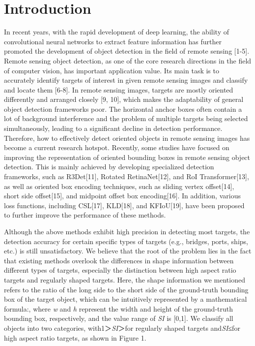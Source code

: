 \documentclass[journal]{IEEEtran}
\begin{document}
\IEEEpeerreviewmaketitle


\section{ Introduction }

In recent years, with the rapid development of deep learning, the ability of convolutional neural networks to extract feature information has further promoted the development of object detection in the field of remote sensing [1-5]. Remote sensing object detection, as one of the core research directions in the field of computer vision, has important application value. Its main task is to accurately identify targets of interest in given remote sensing images and classify and locate them [6-8]. In remote sensing images, targets are mostly oriented differently and arranged closely [9, 10], which makes the adaptability of general object detection frameworks poor. The horizontal anchor boxes often contain a lot of background interference and the problem of multiple targets being selected simultaneously, leading to a significant decline in detection performance. Therefore, how to effectively detect oriented objects in remote sensing images has become a current research hotspot. Recently, some studies have focused on improving the representation of oriented bounding boxes in remote sensing object detection. This is mainly achieved by developing specialized detection frameworks, such as R3Det[11], Rotated RetinaNet[12], and RoI Transformer[13], as well as oriented box encoding techniques, such as sliding vertex offset[14], short side offset[15], and midpoint offset box encoding[16]. In addition, various loss functions, including CSL[17], KLD[18], and KFIoU[19], have been proposed to further improve the performance of these methods.

Although the above methods exhibit high precision in detecting most targets, the detection accuracy for certain specific types of targets (e.g., bridges, ports, ships, etc.) is still unsatisfactory. We believe that the root of the problem lies in the fact that existing methods overlook the differences in shape information between different types of targets, especially the distinction between high aspect ratio targets and regularly shaped targets. Here, the shape information we mentioned refers to the ratio of the long side to the short side of the ground-truth bounding box of the target object, which can be intuitively represented by a mathematical formula:, where \textit{w} and \textit{h} represent the width and height of the ground-truth bounding box, respectively, and the value range of \textit{SI} is [0,1]. We classify all objects into two categories, with1＞\textit{SI}＞for regularly shaped targets and\textit{SI}≤for high aspect ratio targets, as shown in Figure 1.
\end{document}
